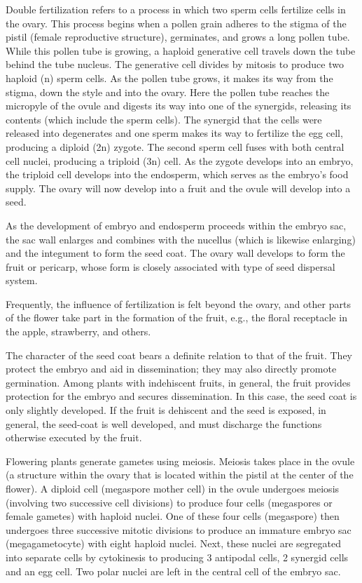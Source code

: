 \documentclass[]{book}
\begin{document}
Double fertilization refers to a process in which two sperm cells fertilize cells in the ovary. This process begins when a pollen grain adheres to the stigma of the pistil (female reproductive structure), germinates, and grows a long pollen tube. While this pollen tube is growing, a haploid generative cell travels down the tube behind the tube nucleus. The generative cell divides by mitosis to produce two haploid (n) sperm cells. As the pollen tube grows, it makes its way from the stigma, down the style and into the ovary. Here the pollen tube reaches the micropyle of the ovule and digests its way into one of the synergids, releasing its contents (which include the sperm cells). The synergid that the cells were released into degenerates and one sperm makes its way to fertilize the egg cell, producing a diploid (2n) zygote. The second sperm cell fuses with both central cell nuclei, producing a triploid (3n) cell. As the zygote develops into an embryo, the triploid cell develops into the endosperm, which serves as the embryo's food supply. The ovary will now develop into a fruit and the ovule will develop into a seed.

As the development of embryo and endosperm proceeds within the embryo sac, the sac wall enlarges and combines with the nucellus (which is likewise enlarging) and the integument to form the seed coat. The ovary wall develops to form the fruit or pericarp, whose form is closely associated with type of seed dispersal system.

Frequently, the influence of fertilization is felt beyond the ovary, and other parts of the flower take part in the formation of the fruit, e.g., the floral receptacle in the apple, strawberry, and others.

The character of the seed coat bears a definite relation to that of the fruit. They protect the embryo and aid in dissemination; they may also directly promote germination. Among plants with indehiscent fruits, in general, the fruit provides protection for the embryo and secures dissemination. In this case, the seed coat is only slightly developed. If the fruit is dehiscent and the seed is exposed, in general, the seed-coat is well developed, and must discharge the functions otherwise executed by the fruit.

Flowering plants generate gametes using meiosis. Meiosis takes place in the ovule (a structure within the ovary that is located within the pistil at the center of the flower). A diploid cell (megaspore mother cell) in the ovule undergoes meiosis (involving two successive cell divisions) to produce four cells (megaspores or female gametes) with haploid nuclei. One of these four cells (megaspore) then undergoes three successive mitotic divisions to produce an immature embryo sac (megagametocyte) with eight haploid nuclei. Next, these nuclei are segregated into separate cells by cytokinesis to producing 3 antipodal cells, 2 synergid cells and an egg cell. Two polar nuclei are left in the central cell of the embryo sac.
\end{document}

